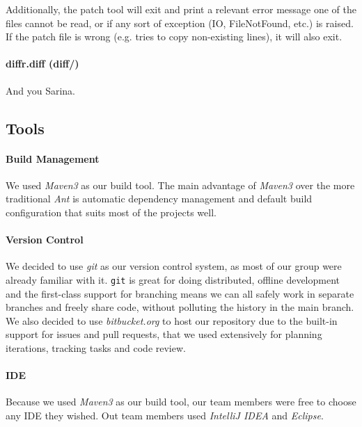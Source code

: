 Additionally, the patch tool will exit and print a relevant error message one of the files cannot be read, or if any sort of exception (IO, FileNotFound, etc.) is raised. If the patch file is wrong (e.g. tries to copy non-existing lines), it will also exit.

\paragraph{diffr.diff (diff/)}

And you Sarina.

\subsection{Tools}

\paragraph{Build Management}

We used \textit{Maven3} as our build tool. The main advantage of \textit{Maven3} over the more traditional \textit{Ant} is automatic dependency management and default build configuration that suits most of the projects well.

\paragraph{Version Control}
We decided to use \textit{git} as our version control system, as most of our group were already familiar with it. \texttt{git} is great for doing distributed, offline development and the first-class support for branching means we can all safely work in separate branches and freely share code, without polluting the history in the main branch. We also decided to use \textit{bitbucket.org} to host our repository due to the built-in support for issues and pull requests, that we used extensively for planning iterations, tracking tasks and code review.

\paragraph{IDE}
Because we used \textit{Maven3} as our build tool, our team members were free to choose any IDE they wished. Out team members used \textit{IntelliJ IDEA} and \textit{Eclipse}.

